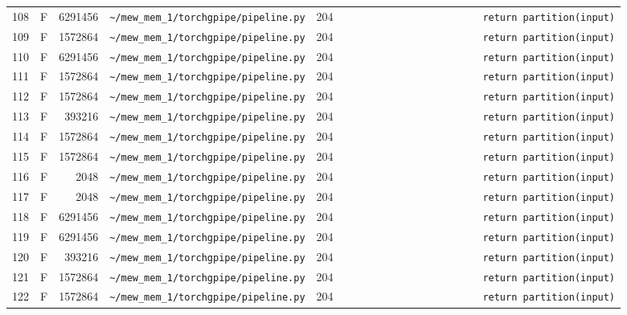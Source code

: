 \documentclass{article}
\begin{document}
\begin{longtable}{r l r p{6.5cm} r p{7.0cm}}
108 & F & 6291456 & \lstinline|~/mew_mem_1/torchgpipe/pipeline.py| & 204 & \lstinline|                        return partition(input)| \\
109 & F & 1572864 & \lstinline|~/mew_mem_1/torchgpipe/pipeline.py| & 204 & \lstinline|                        return partition(input)| \\
110 & F & 6291456 & \lstinline|~/mew_mem_1/torchgpipe/pipeline.py| & 204 & \lstinline|                        return partition(input)| \\
111 & F & 1572864 & \lstinline|~/mew_mem_1/torchgpipe/pipeline.py| & 204 & \lstinline|                        return partition(input)| \\
112 & F & 1572864 & \lstinline|~/mew_mem_1/torchgpipe/pipeline.py| & 204 & \lstinline|                        return partition(input)| \\
113 & F & 393216 & \lstinline|~/mew_mem_1/torchgpipe/pipeline.py| & 204 & \lstinline|                        return partition(input)| \\
114 & F & 1572864 & \lstinline|~/mew_mem_1/torchgpipe/pipeline.py| & 204 & \lstinline|                        return partition(input)| \\
115 & F & 1572864 & \lstinline|~/mew_mem_1/torchgpipe/pipeline.py| & 204 & \lstinline|                        return partition(input)| \\
116 & F & 2048 & \lstinline|~/mew_mem_1/torchgpipe/pipeline.py| & 204 & \lstinline|                        return partition(input)| \\
117 & F & 2048 & \lstinline|~/mew_mem_1/torchgpipe/pipeline.py| & 204 & \lstinline|                        return partition(input)| \\
118 & F & 6291456 & \lstinline|~/mew_mem_1/torchgpipe/pipeline.py| & 204 & \lstinline|                        return partition(input)| \\
119 & F & 6291456 & \lstinline|~/mew_mem_1/torchgpipe/pipeline.py| & 204 & \lstinline|                        return partition(input)| \\
120 & F & 393216 & \lstinline|~/mew_mem_1/torchgpipe/pipeline.py| & 204 & \lstinline|                        return partition(input)| \\
121 & F & 1572864 & \lstinline|~/mew_mem_1/torchgpipe/pipeline.py| & 204 & \lstinline|                        return partition(input)| \\
122 & F & 1572864 & \lstinline|~/mew_mem_1/torchgpipe/pipeline.py| & 204 & \lstinline|                        return partition(input)| \\

\end{longtable}
\end{document}
